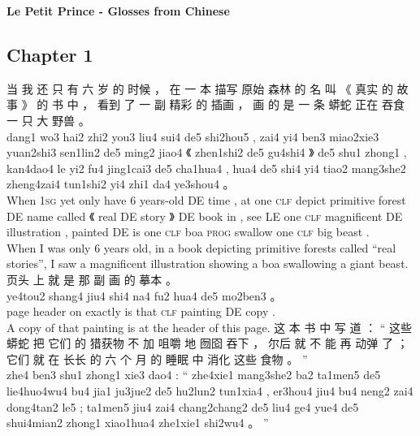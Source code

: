 \documentclass[UTF8]{ctexart}
\begin{document}
\begin{center}
\textbf{\Large{Le Petit Prince - Glosses from Chinese}}\\
\end{center}

\subsection*{Chapter 1}

\begin{exe}
\ex 
\glll
当 我 还 只 有 六 岁 的 时候 ， 在 一 本 描写 原始 森林 的 名 叫 《 真实 的 故事 》 的 书 中 ， 看到 了 一 副 精彩 的 插画 ， 画 的 是 一 条 蟒蛇 正在 吞食 一 只 大 野兽 。
\\
dang1 wo3 hai2 zhi2 you3 liu4 sui4 de5 shi2hou5 , zai4 yi4 ben3 miao2xie3 yuan2shi3 sen1lin2 de5 ming2 jiao4 《 zhen1shi2 de5 gu4shi4 》 de5 shu1 zhong1 , kan4dao4 le yi2 fu4 jing1cai3 de5 cha1hua4 , hua4 de5 shi4 yi4 tiao2 mang3she2 zheng4zai4 tun1shi2 yi4 zhi1 da4 ye3shou4 。
\\
When \textsc{1sg} yet only have 6 years-old DE time , at one \textsc{clf} depict primitive forest DE name called 《 real DE story 》 DE book in , see LE one \textsc{clf} magnificent DE illustration , painted DE is one \textsc{clf} boa \textsc{prog} swallow one \textsc{clf} big beast . 
\\
\trans When I was only 6 years old, in a book depicting primitive forests called ``real stories'', I saw a magnificent illustration showing a boa swallowing a giant beast. 
\ex
\glll
页头 上 就 是 那 副 画 的 摹本 。 
\\
ye4tou2 shang4 jiu4 shi4 na4 fu2 hua4 de5 mo2ben3 。
\\
{page header} on exactly is that \textsc{clf} painting DE copy .
\\
\trans A copy of that painting is at the header of this page. 
\ex
\glll
这 本 书 中 写 道 ： `` 这些 蟒蛇 把 它们 的 猎获物 不 加 咀嚼 地 囫囵 吞下 ， 尔后 就 不 能 再 动弹 了 ； 它们 就 在 长长 的 六 个 月 的 睡眠 中 消化 这些 食物 。 '' 
\\
zhe4 ben3 shu1 zhong1 xie3 dao4 : `` zhe4xie1 mang3she2 ba2 ta1men5 de5 lie4huo4wu4 bu4 jia1 ju3jue2 de5 hu2lun2 tun1xia4 , er3hou4 jiu4 bu4 neng2 zai4 dong4tan2 le5 ; ta1men5 jiu4 zai4 chang2chang2 de5 liu4 ge4 yue4 de5 shui4mian2 zhong1 xiao1hua4 zhe1xie1 shi2wu4 。 ''
\\

\end{exe}
\end{document}
